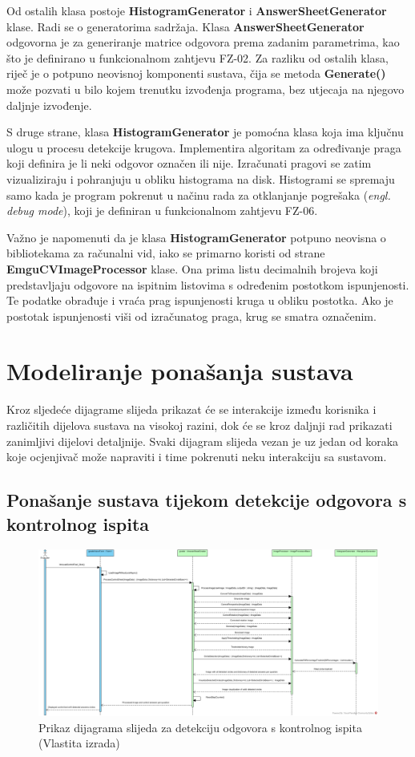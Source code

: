 \documentclass{foi}
\begin{document}
Od ostalih klasa postoje \textbf{HistogramGenerator} i \textbf{AnswerSheetGenerator} klase. Radi se o generatorima sadržaja. Klasa \textbf{AnswerSheetGenerator} odgovorna je za generiranje matrice odgovora prema zadanim parametrima, kao što je definirano u funkcionalnom zahtjevu FZ-02. Za razliku od ostalih klasa, riječ je o potpuno neovisnoj komponenti sustava, čija se metoda \textbf{Generate()} može pozvati u bilo kojem trenutku izvođenja programa, bez utjecaja na njegovo daljnje izvođenje.

S druge strane, klasa \textbf{HistogramGenerator} je pomoćna klasa koja ima ključnu ulogu u procesu detekcije krugova. Implementira algoritam za određivanje praga koji definira je li neki odgovor označen ili nije. Izračunati pragovi se zatim  vizualiziraju i pohranjuju u obliku histograma na disk. Histogrami se spremaju samo kada je program pokrenut u načinu rada za otklanjanje pogrešaka (\textit{engl. debug mode}), koji je definiran u funkcionalnom zahtjevu FZ-06.

Važno je napomenuti da je klasa \textbf{HistogramGenerator} potpuno neovisna o bibliotekama za računalni vid, iako se primarno koristi od strane \textbf{EmguCVImageProcessor} klase. Ona prima listu decimalnih brojeva koji predstavljaju odgovore na ispitnim listovima s određenim postotkom ispunjenosti. Te podatke obrađuje i vraća prag ispunjenosti kruga u obliku postotka. Ako je postotak ispunjenosti viši od izračunatog praga, krug se smatra označenim.

\section{Modeliranje ponašanja sustava}

Kroz sljedeće dijagrame slijeda prikazat će se interakcije između korisnika i različitih dijelova sustava na visokoj razini, dok će se kroz daljnji rad prikazati zanimljivi dijelovi detaljnije. Svaki dijagram slijeda vezan je uz jedan od koraka koje ocjenjivač može napraviti i time pokrenuti neku interakciju sa sustavom.

\subsection{Ponašanje sustava tijekom detekcije odgovora s kontrolnog ispita}

\begin{figure}[H]
\centering
\includegraphics[width=1.0\linewidth]{slike/sequence1.jpg}
\caption{Prikaz dijagrama slijeda za detekciju odgovora s kontrolnog ispita (Vlastita izrada)}
\end{figure}
\end{document}

